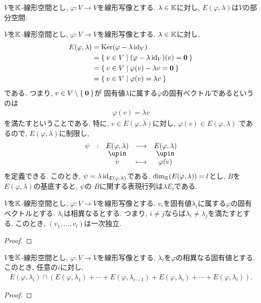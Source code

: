 \begin{remark}
  $V$を$\mathbb{K}$-線形空間とし,
  $\varphi\colon V\to V$を線形写像とする.
  $\lambda \in \mathbb{K}$に対し,
  $E(\varphi,\lambda)$は$V$の部分空間.
\end{remark}

\begin{remark}
  $V$を$\mathbb{K}$-線形空間とし,
  $\varphi\colon V\to V$を線形写像とする.
  $\lambda \in \mathbb{K}$に対し,
  \begin{align*}
    E(\varphi,\lambda) &= \operatorname{Ker}(\varphi - \lambda\operatorname{id}_V)\\
    &= \Set{v\in V|(\varphi - \lambda\operatorname{id}_V)(v)=\boldsymbol{0}}\\
    &= \Set{v\in V|\varphi(v) - \lambda v =\boldsymbol{0}}\\
    &= \Set{v\in V|\varphi(v) = \lambda v }
  \end{align*}
  である.
  つまり, $v\in V\setminus\Set{\boldsymbol{0}}$が
  固有値$\lambda$に属する$\varphi$の固有ベクトルであるというのは
  \begin{align*}
    \varphi(v)=\lambda v
  \end{align*}
  を満たすということである.
  特に, $v\in E(\varphi,\lambda)$に対し, $\varphi(v)\in E(\varphi,\lambda)$
  であるので,
  $E(\varphi,\lambda)$に制限し,
  \begin{align*}
    \shazo{\psi}{E(\varphi,\lambda)}{E(\varphi,\lambda)}
    {v}{\varphi(v)}
  \end{align*}
  を定義できる. 
  このとき, $\psi=\lambda \operatorname{id}_{E(\varphi,\lambda)}$である.
  $\dim_{\mathbb{K}}(E(\varphi,\lambda))=l$とし, $B$を
  $E(\varphi,\lambda)$の基底すると,
  $\psi$の
  $B$に関する表現行列は$\lambda E_l$である.
\end{remark}
  

\begin{prop}
  $V$を$\mathbb{K}$-線形空間とし,
  $\varphi\colon V\to V$を線形写像とする.
  $v_i$を固有値$\lambda_i$に属する$\varphi$の固有ベクトルとする.
  $\lambda_i$は相異なるとする.
  つまり, $i\neq j$ならば$\lambda_i \neq \lambda_j$を満たすとする.
  このとき,
  $(v_1,\ldots, v_l)$は一次独立.
\end{prop}
\begin{proof}\end{proof}

\begin{cor}
  $V$を$\mathbb{K}$-線形空間とし,
  $\varphi\colon V\to V$を線形写像とする.
  $\lambda_i$を$\varphi$の相異なる固有値とする.
  このとき, 任意の$i$に対し,
  \begin{align*}
    E(\varphi,\lambda_i)\cap(E(\varphi,\lambda_1)+\cdots +E(\varphi,\lambda_{i-1})+E(\varphi,\lambda_i)+\cdots +E(\varphi,\lambda_{l})).
  \end{align*}
\end{cor}
\begin{proof}\end{proof}

